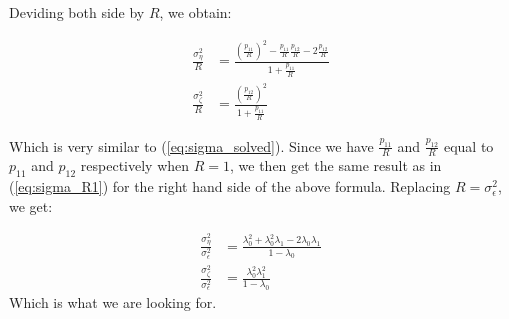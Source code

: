 Deviding both side by $R$, we obtain: 

\begin{equation}
\begin{split}
\frac{\sigma_{\eta}^2}{R} &= \frac{(\frac{p_{11}}{R})^2-\frac{p_{11}}{R}\frac{p_{12}}{R}-2\frac{p_{12}}{R}}{1+\frac{p_{11}}{R}}\\
\frac{\sigma_{\zeta}^2}{R} &= \frac{(\frac{p_{12}}{R})^2}{1+\frac{p_{11}}{R}}
\end{split}
\end{equation}

Which is very similar to (\ref{eq:sigma_solved}). Since we have $\frac{p_{11}}{R}$ and $\frac{p_{12}}{R}$ equal to $p_{11}$ and $p_{12}$ respectively when $R = 1$, we then get the same result as in (\ref{eq:sigma_R1}) for the right hand side of the above formula. Replacing $R = \sigma^2_\epsilon$, we get:

\begin{equation} \label{eq:sigma_R}
\begin{split}
\frac{\sigma_{\eta}^2}{\sigma^2_\epsilon} &= \frac{\lambda^2_0 + \lambda^2_0\lambda_1 - 2\lambda_0\lambda_1}{1-\lambda_0}\\
\frac{\sigma_{\zeta}^2}{\sigma^2_\epsilon} &= \frac{\lambda^2_0\lambda^2_1}{1-\lambda_0}
\end{split}
\end{equation}
Which is what we are looking for.


